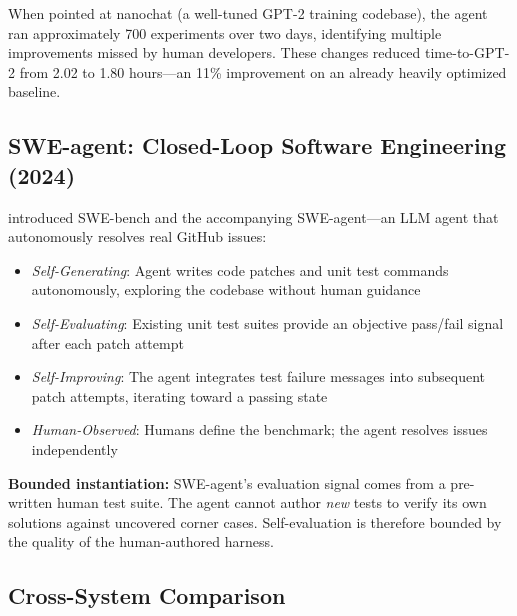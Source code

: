 \documentclass[11pt]{article}
\begin{document}
When pointed at nanochat (a well-tuned GPT-2 training codebase), the agent ran approximately 700 experiments over two days, identifying multiple improvements missed by human developers. These changes reduced time-to-GPT-2 from 2.02 to 1.80 hours---an 11\% improvement on an already heavily optimized baseline.

\subsection{SWE-agent: Closed-Loop Software Engineering (2024)}

\citet{jimenez2024swebench} introduced SWE-bench and the accompanying SWE-agent---an LLM agent that autonomously resolves real GitHub issues:
\begin{itemize}[nosep]
  \item \emph{Self-Generating}: Agent writes code patches and unit test commands autonomously, exploring the codebase without human guidance
  \item \emph{Self-Evaluating}: Existing unit test suites provide an objective pass/fail signal after each patch attempt
  \item \emph{Self-Improving}: The agent integrates test failure messages into subsequent patch attempts, iterating toward a passing state
  \item \emph{Human-Observed}: Humans define the benchmark; the agent resolves issues independently
\end{itemize}

\textbf{Bounded instantiation:} SWE-agent's evaluation signal comes from a pre-written human test suite. The agent cannot author \emph{new} tests to verify its own solutions against uncovered corner cases. Self-evaluation is therefore bounded by the quality of the human-authored harness.

\subsection{Cross-System Comparison}
\end{document}
